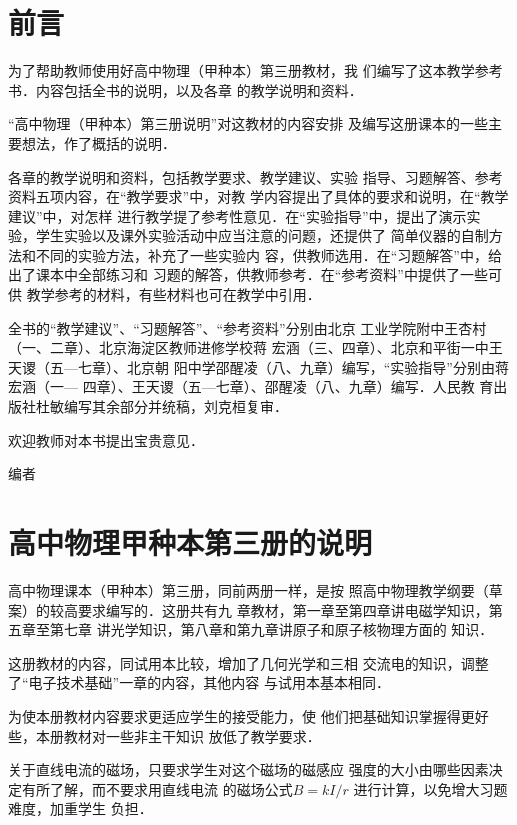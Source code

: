 \chapter{前言}
为了帮助教师使用好高中物理（甲种本）第三册教材，我
们编写了这本教学参考书．内容包括全书的说明，以及各章
的教学说明和资料．

“高中物理（甲种本）第三册说明”对这教材的内容安排
及编写这册课本的一些主要想法，作了概括的说明．

各章的教学说明和资料，包括教学要求、教学建议、实验
指导、习题解答、参考资料五项内容，在“教学要求”中，对教
学内容提出了具体的要求和说明，在“教学建议”中，对怎样
进行教学提了参考性意见．在“实验指导”中，提出了演示实
验，学生实验以及课外实验活动中应当注意的问题，还提供了
简单仪器的自制方法和不同的实验方法，补充了一些实验内
容，供教师选用．在“习题解答”中，给出了课本中全部练习和
习题的解答，供教师参考．在“参考资料”中提供了一些可供
教学参考的材料，有些材料也可在教学中引用．

全书的“教学建议”、“习题解答”、“参考资料”分别由北京
工业学院附中王杏村（一、二章）、北京海淀区教师进修学校蒋
宏涵（三、四章）、北京和平街一中王天谡（五—七章）、北京朝
阳中学邵醒凌（八、九章）编写，“实验指导”分别由蒋宏涵（一—
四章）、王天谡（五—七章）、邵醒凌（八、九章）编写．人民教
育出版社杜敏编写其余部分并统稿，刘克桓复审．

欢迎教师对本书提出宝贵意见．

\begin{flushright}
    编者
\end{flushright}


\chapter{高中物理甲种本第三册的说明}

高中物理课本（甲种本）第三册，同前两册一样，是按
照高中物理教学纲要（草案）的较高要求编写的．这册共有九
章教材，第一章至第四章讲电磁学知识，第五章至第七章
讲光学知识，第八章和第九章讲原子和原子核物理方面的
知识．

这册教材的内容，同试用本比较，增加了几何光学和三相
交流电的知识，调整了“电子技术基础”一章的内容，其他内容
与试用本基本相同．

为使本册教材内容要求更适应学生的接受能力，使
他们把基础知识掌握得更好些，本册教材对一些非主干知识
放低了教学要求．

关于直线电流的磁场，只要求学生对这个磁场的磁感应
强度的大小由哪些因素决定有所了解，而不要求用直线电流
的磁场公式$B=kI/r$
进行计算，以免增大习题难度，加重学生
负担．

